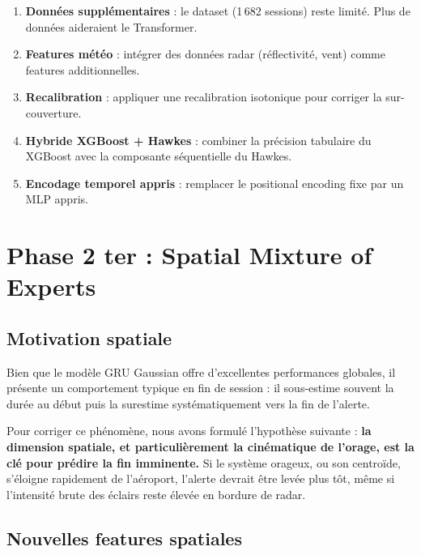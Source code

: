 \documentclass[11pt,a4paper]{article}
\begin{document}
\begin{enumerate}[nosep]
  \item \textbf{Données supplémentaires} : le dataset (1\,682 sessions) reste limité. Plus de données aideraient le Transformer.
  \item \textbf{Features météo} : intégrer des données radar (réflectivité, vent) comme features additionnelles.
  \item \textbf{Recalibration} : appliquer une recalibration isotonique pour corriger la sur-couverture.
  \item \textbf{Hybride XGBoost + Hawkes} : combiner la précision tabulaire du XGBoost avec la composante séquentielle du Hawkes.
  \item \textbf{Encodage temporel appris} : remplacer le positional encoding fixe par un MLP appris.
\end{enumerate}


\section{Phase 2 ter : Spatial Mixture of Experts}

\subsection{Motivation spatiale}

Bien que le modèle GRU Gaussian offre d'excellentes performances globales, il présente un comportement typique en fin de session : il sous-estime souvent la durée au début puis la surestime systématiquement vers la fin de l'alerte.

Pour corriger ce phénomène, nous avons formulé l'hypothèse suivante : \textbf{la dimension spatiale, et particulièrement la cinématique de l'orage, est la clé pour prédire la fin imminente.} Si le système orageux, ou son centroïde, s'éloigne rapidement de l'aéroport, l'alerte devrait être levée plus tôt, même si l'intensité brute des éclairs reste élevée en bordure de radar.

\subsection{Nouvelles features spatiales}
\end{document}
